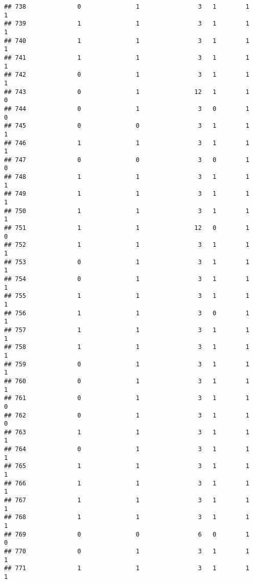 \documentclass[]{article}
\begin{document}
\begin{verbatim}
## 738              0               1                3   1        1        1
## 739              1               1                3   1        1        1
## 740              1               1                3   1        1        1
## 741              1               1                3   1        1        1
## 742              0               1                3   1        1        1
## 743              0               1               12   1        1        0
## 744              0               1                3   0        1        0
## 745              0               0                3   1        1        1
## 746              1               1                3   1        1        1
## 747              0               0                3   0        1        0
## 748              1               1                3   1        1        1
## 749              1               1                3   1        1        1
## 750              1               1                3   1        1        1
## 751              1               1               12   0        1        0
## 752              1               1                3   1        1        1
## 753              0               1                3   1        1        1
## 754              0               1                3   1        1        1
## 755              1               1                3   1        1        1
## 756              1               1                3   0        1        1
## 757              1               1                3   1        1        1
## 758              1               1                3   1        1        1
## 759              0               1                3   1        1        1
## 760              0               1                3   1        1        1
## 761              0               1                3   1        1        0
## 762              0               1                3   1        1        0
## 763              1               1                3   1        1        1
## 764              0               1                3   1        1        1
## 765              1               1                3   1        1        1
## 766              1               1                3   1        1        1
## 767              1               1                3   1        1        1
## 768              1               1                3   1        1        1
## 769              0               0                6   0        1        0
## 770              0               1                3   1        1        1
## 771              1               1                3   1        1        1

\end{verbatim}
\end{document}
